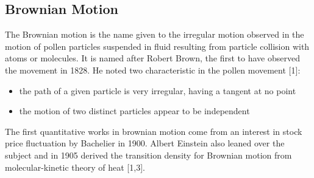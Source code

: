\documentclass[12pt,twoside]{reedthesis}
\theoremstyle{definition}
\theoremstyle{definition}
\theoremstyle{remark}
\begin{document}
  \subsection{Brownian Motion}\label{brownian-motion}
  
  The Brownian motion is the name given to the irregular motion observed
  in the motion of pollen particles suspended in fluid resulting from
  particle collision with atoms or molecules. It is named after Robert
  Brown, the first to have observed the movement in 1828. He noted two
  characteristic in the pollen movement {[}1{]}:
  \begin{itemize}
  \item
    the path of a given particle is very irregular, having a tangent at no
    point
  \item
    the motion of two distinct particles appear to be independent
  \end{itemize}
  The first quantitative works in brownian motion come from an interest in
  stock price fluctuation by Bachelier in 1900. Albert Einstein also
  leaned over the subject and in 1905 derived the transition density for
  Brownian motion from molecular-kinetic theory of heat {[}1,3{]}.
  
\end{document}
